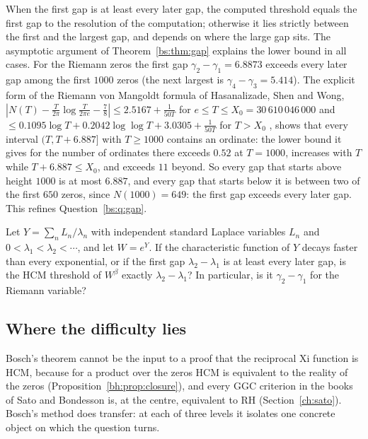 When the first gap is at least every later gap, the computed threshold equals the first gap to the resolution of the computation; otherwise it lies strictly between the first and the largest gap, and depends on where the large gap sits. The asymptotic argument of Theorem~\ref{bs:thm:gap} explains the lower bound in all cases. For the Riemann zeros the first gap $\gamma_2-\gamma_1=6.8873$ exceeds every later gap among the first $1000$ zeros (the next largest is $\gamma_4-\gamma_3=5.414$). The explicit form of the Riemann von Mangoldt formula of Hasanalizade, Shen and Wong, $|N(T)-\frac T{2\pi}\log\frac T{2\pi e}-\frac78|\le2.5167+\frac1{50T}$ for $e\le T\le X_0=30\,610\,046\,000$ and $\le0.1095\log T+0.2042\log\log T+3.0305+\frac1{50T}$ for $T>X_0$ \cite[(1.7), (2.7) and Corollary~1.4]{HSW22}, shows that every interval $(T,T+6.887]$ with $T\ge1000$ contains an ordinate: the lower bound it gives for the number of ordinates there exceeds $0.52$ at $T=1000$, increases with $T$ while $T+6.887\le X_0$, and exceeds $11$ beyond. So every gap that starts above height $1000$ is at most $6.887$, and every gap that starts below it is between two of the first $650$ zeros, since $N(1000)=649$: the first gap exceeds every later gap. This refines Question~\ref{bs:q:gap}.

\begin{question}\label{bs:q:gaprefined}
Let $Y=\sum_nL_n/\lambda_n$ with independent standard Laplace variables $L_n$ and $0<\lambda_1<\lambda_2<\cdots$, and let $W=e^Y$. If the characteristic function of $Y$ decays faster than every exponential, or if the first gap $\lambda_2-\lambda_1$ is at least every later gap, is the HCM threshold of $W^\beta$ exactly $\lambda_2-\lambda_1$? In particular, is it $\gamma_2-\gamma_1$ for the Riemann variable?
\end{question}

\subsection{Where the difficulty lies}\label{bs:sec:discussion}

Bosch's theorem cannot be the input to a proof that the reciprocal Xi function is HCM, because for a product over the zeros HCM is equivalent to the reality of the zeros (Proposition~\ref{bh:prop:closure}), and every GGC criterion in the books of Sato and Bondesson is, at the centre, equivalent to RH (Section~\ref{ch:sato}). Bosch's method does transfer: at each of three levels it isolates one concrete object on which the question turns.

